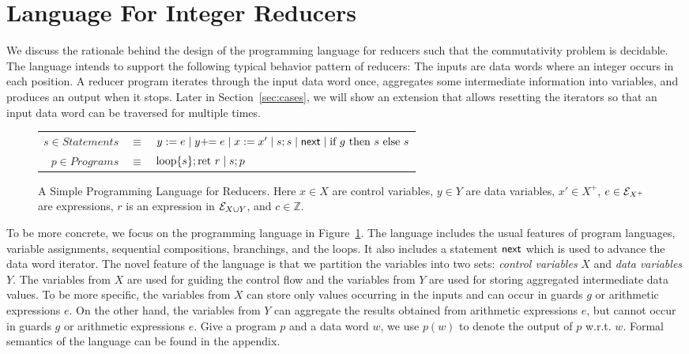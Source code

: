  
\section{Language For Integer Reducers}\label{sec-mr-prog}
\label{sec:language}
We discuss the rationale behind the design of the programming language for reducers such that the commutativity problem is decidable. The language intends to support the following typical behavior pattern of reducers: The inputs are data words where an integer occurs in each position. A reducer program iterates through the input data word once, aggregates some intermediate information into variables, and produces an output when it stops. 
%
Later in Section~\ref{sec:cases}, we will show an extension that allows resetting the iterators so that an input data word can be traversed for multiple times.

\begin{figure}
	\vspace{-0.5cm}
	\centering
	\begin{tabular}{rcl}
        $ s \in Statements$&$\equiv$&$y := e\mid y +\!\!= e \mid x:=x'\mid s;s\mid \mathsf{next} \mid \mbox{if } g \mbox{ then } s\mbox{ else }s$\\
		$ p\in Programs$&$\equiv$&$\mbox{loop\{} s\mbox{\}};\mbox{ret }r \mid s;p$		
	\end{tabular}
	\label{fig:language}
	\caption{A Simple Programming Language for Reducers. Here $x\in X$ are control variables, $y\in Y$ are data variables, $x' \in X^+$, $e\in {\mathcal{E} }_{X^+}$ are expressions, $r$ is an expression in ${\mathcal{E} }_{X \cup Y}$, and $c\in \mathbb{Z}$.}
	\vspace{-0.5cm}
\end{figure}

To be more concrete, we focus on the programming language in Figure~\ref{fig:language}. The language includes the usual features of program languages, variable assignments, sequential compositions, branchings, and the loops. It also includes a statement $\mathsf{next}$ which is used to advance the data word iterator.
The novel feature of the language is that we partition the variables into two sets: \emph{control variables} $X$ and \emph{data variables} $Y$.
The variables from $X$ are used for guiding the control flow and the variables from $Y$ are used for storing aggregated intermediate data values.
To be more specific, the variables from $X$ can store only values occurring in the inputs and can occur in guards $g$ or arithmetic expressions $e$.
On the other hand, the variables from $Y$ can aggregate the results obtained from arithmetic expressions $e$, but cannot occur in guards $g$ or arithmetic expressions $e$.
Give a program $p$ and a data word $w$, we use $p(w)$ to denote the output of $p$ w.r.t. $w$. Formal semantics of the language can be found in the appendix.

